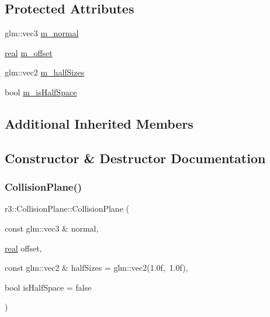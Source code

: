 \subsection*{Protected Attributes}
\begin{DoxyCompactItemize}
\item 
glm\+::vec3 \mbox{\hyperlink{classr3_1_1_collision_plane_ab65e832434d2da433e79c93ac12f4b43}{m\+\_\+normal}}
\item 
\mbox{\hyperlink{namespacer3_ab2016b3e3f743fb735afce242f0dc1eb}{real}} \mbox{\hyperlink{classr3_1_1_collision_plane_a8ae3c28197b05088e405ff9944632f74}{m\+\_\+offset}}
\item 
glm\+::vec2 \mbox{\hyperlink{classr3_1_1_collision_plane_a8e642d9075ceebd029f3869ace65dd5f}{m\+\_\+half\+Sizes}}
\item 
bool \mbox{\hyperlink{classr3_1_1_collision_plane_a6d560c5f7627efec1d094905ec4e7d60}{m\+\_\+is\+Half\+Space}}
\end{DoxyCompactItemize}
\subsection*{Additional Inherited Members}


\subsection{Constructor \& Destructor Documentation}
\mbox{\label{classr3_1_1_collision_plane_ae3f8642b62667018e4a4c3120880fd0f}} 
\subsubsection{\texorpdfstring{Collision\+Plane()}{CollisionPlane()}}
{\footnotesize\ttfamily r3\+::\+Collision\+Plane\+::\+Collision\+Plane (\begin{DoxyParamCaption}\item[{const glm\+::vec3 \&}]{normal,  }\item[{\mbox{\hyperlink{namespacer3_ab2016b3e3f743fb735afce242f0dc1eb}{real}}}]{offset,  }\item[{const glm\+::vec2 \&}]{half\+Sizes = {\ttfamily glm\+:\+:vec2(1.0f,~1.0f)},  }\item[{bool}]{is\+Half\+Space = {\ttfamily false} }\end{DoxyParamCaption})}

